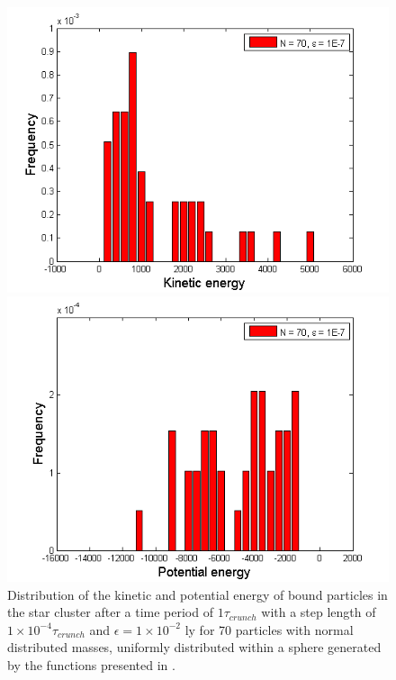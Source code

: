 \begin{figure}[H]
\centering
\begin{minipage}{.5\textwidth}
  \centering
  \includegraphics[width=1\linewidth]{Figures/epsilon7_kin.png}
\end{minipage}%
\begin{minipage}{.5\textwidth}
  \centering
  \includegraphics[width=1\linewidth]{Figures/epsilon7_pot.png}
\end{minipage}
\caption{
	Distribution of the kinetic and potential energy of bound particles in the star cluster after a time period of $1\tau_{crunch}$ with a step length of $1\times 10^{-4} \tau_{crunch}$ and $\epsilon = 1\times 10^{-2} \text{ ly}$ for 70 particles with normal distributed masses, uniformly distributed within a sphere generated by the functions presented in . 
}
\label{fig:DistributionPotKinEnBoundHistograms2}
\end{figure}
